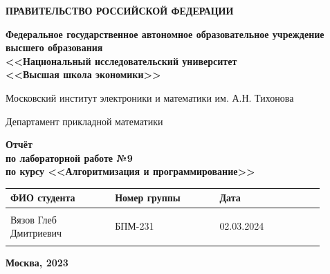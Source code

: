 \documentclass[12pt]{article}
\begin{document}
\thispagestyle{empty}
\begin{center}
\textbf{ПРАВИТЕЛЬСТВО РОССИЙСКОЙ ФЕДЕРАЦИИ}

\vspace{5ex}
	
\textbf{Федеральное государственное автономное образовательное учреждение \\ высшего образования \\ <<Национальный исследовательский университет \\ <<Высшая школа экономики>>}
\end{center}
\vspace{5ex}

\begin{center}
    Московский институт электроники и математики им. А.Н. Тихонова  
    
    \vspace{5ex}
    
    Департамент прикладной математики
    
    \vspace{10ex}
    \textbf{Отчёт \\ по лабораторной работе №9 \\ по курсу <<Алгоритмизация и программирование>>}
	\vspace{7ex}

\end{center}

\begin{center} 
\begin{tabular}{| p{0.3\linewidth}| p{0.3\linewidth}| p{0.3\linewidth}|}
 \hline	
ФИО студента & Номер группы & Дата \\  \hline
 & & \\  
Вязов Глеб \newline Дмитриевич & БПМ-231 & 02.03.2024\\  
 & & \\  \hline		
\end{tabular}
\end{center}

\begin{center}
	\vspace{3ex}
	
	\vfill
   
   \normalsize
    
	\textbf{Москва, 2023}
\end{center}

\newpage

\end{document}
